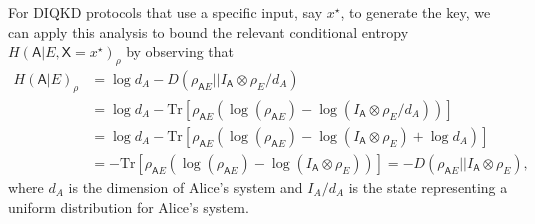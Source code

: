 \documentclass[10pt, a4paper]{article}
\numberwithin{equation}{section} %
\theoremstyle{definition}
\theoremstyle{plain}
\newcommand{\?}{\mathrel{?}} %
\newcommand{\Tr}{\mathrm{Tr}} %
\newcommand{\crv}[1]{\mathsf{#1}}
\begin{document}
      For DIQKD protocols that use a specific input, say \(x^{\star}\), to generate the key, we can apply this analysis to bound the relevant conditional entropy \(H{(\crv{A}|E, \crv{X}=x^{\star})}_{\rho}\) by observing that
      \begin{align*}
        H{(\crv{A}|E)}_{\rho} &= \log d_A - D(\rho_{\crv{A}E}||I_{\crv{A}}\otimes\rho_{E} / d_A) \\
                              &= \log d_A - \Tr\left[\rho_{\crv{A}E}(\log(\rho_{\crv{A}E}) - \log(I_{\crv{A}}\otimes\rho_{E} / d_A))\right] \\
                              &= \log d_A - \Tr\left[\rho_{\crv{A}E}(\log(\rho_{\crv{A}E}) - \log(I_{\crv{A}}\otimes\rho_{E}) + \log d_A)\right] \\
                              &= -\Tr\left[\rho_{\crv{A}E}(\log(\rho_{\crv{A}E}) - \log(I_{\crv{A}}\otimes\rho_{E}))\right] = -D(\rho_{\crv{A}E}||I_{\crv{A}}\otimes\rho_{E}),
      \end{align*}
      where \(d_A\) is the dimension of Alice's system and \(I_A/d_A\) is the state representing a uniform distribution for Alice's system.
\end{document}
